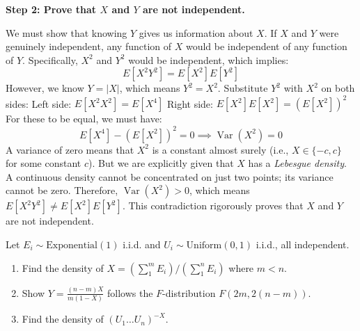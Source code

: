 \begin{solution}
\textbf{Step 2: Prove that $X$ and $Y$ are not independent.}

We must show that knowing $Y$ gives us information about $X$.
If $X$ and $Y$ were genuinely independent, any function of $X$ would be independent of any function of $Y$.
Specifically, $X^2$ and $Y^2$ would be independent, which implies:
\[ E[X^2 Y^2] = E[X^2] E[Y^2] \]
However, we know $Y = |X|$, which means $Y^2 = X^2$.
Substitute $Y^2$ with $X^2$ on both sides:
Left side: $E[X^2 X^2] = E[X^4]$
Right side: $E[X^2] E[X^2] = (E[X^2])^2$
For these to be equal, we must have:
\[ E[X^4] - (E[X^2])^2 = 0 \implies \operatorname{Var}(X^2) = 0 \]
A variance of zero means that $X^2$ is a constant almost surely (i.e., $X \in \{-c, c\}$ for some constant $c$).
But we are explicitly given that $X$ has a \textit{Lebesgue density}. A continuous density cannot be concentrated on just two points; its variance cannot be zero.
Therefore, $\operatorname{Var}(X^2) > 0$, which means $E[X^2 Y^2] \neq E[X^2] E[Y^2]$.
This contradiction rigorously proves that $X$ and $Y$ are not independent.
\end{solution}

\begin{exercise}\label{probability:2012:6}
Let $E_i \sim \mathrm{Exponential}(1)$ i.i.d. and $U_i \sim \mathrm{Uniform}(0,1)$ i.i.d., all independent.
\begin{enumerate}
    \item Find the density of $X = (\sum_1^m E_i) / (\sum_1^n E_i)$ where $m < n$.
    \item Show $Y = \frac{(n-m)X}{m(1-X)}$ follows the $F$-distribution $F(2m, 2(n-m))$.
    \item Find the density of $(U_1 \dots U_n)^{-X}$.
\end{enumerate}
\end{exercise}

